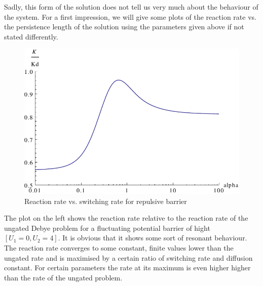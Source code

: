 Sadly, this form of the solution does not tell us very much about the behaviour of the system. For a first impression, we will give some plots of the reaction rate vs. the persistence length of the solution using the parameters given above if not stated differently.\\
\begin{minipage}[t]{0.7 \textwidth}
    \begin{figure}[H]
        \includegraphics[width = 1 \textwidth]{plots/rate1.pdf}
    \caption{Reaction rate vs. switching rate for repulsive barrier}
    \label{fig:finite_barrier_rate+}
    \end{figure}
\end{minipage}\begin{minipage}[t]{0.3 \textwidth}
The plot on the left shows the reaction rate relative to the reaction rate of the ungated Debye problem for a fluctuating potential barrier of hight $[U_1 = 0, U_2 = 4]$. It is obvious that it shows some sort of resonant behaviour. The reaction rate converges to some constant, finite values lower than the ungated rate and is maximised by a certain ratio of switching rate and diffusion constant. For certain parameters the rate at its maximum is even higher higher than the rate of the ungated problem.
\end{minipage}
\par

